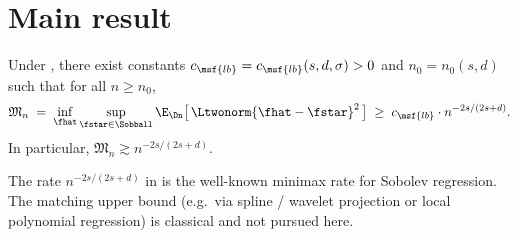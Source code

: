 \section{Main result}\label{sec:main-result}

\begin{theorem}\label{thm:main}
Under , there exist constants $c_{\msf{lb}} = c_{\msf{lb}}(s, d, \sigma) > 0$ and $n_0 = n_0(s, d)$ such that for all $n \geq n_0$,
\begin{align}\label{eq:main-bound}
\mathfrak{M}_n
\;=\;
\inf_{\fhat} \sup_{\fstar \in \Sobball}
\E_{\Dn} \bigl[\, \Ltwonorm{\fhat - \fstar}^2 \,\bigr]
\;\geq\;
c_{\msf{lb}} \cdot n^{-2s/(2s+d)}.
\end{align}
In particular, $\mathfrak{M}_n \gtrsim n^{-2s/(2s+d)}$.
\end{theorem}

\begin{remark}\label{rem:main-tightness}
The rate $n^{-2s/(2s+d)}$ in  is the well-known minimax rate for Sobolev regression. The matching upper bound (e.g.\ via spline / wavelet projection or local polynomial regression) is classical and not pursued here.
\end{remark}

